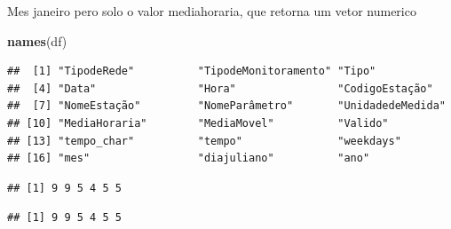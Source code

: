 \documentclass[]{book}
\newenvironment{Shaded}{\begin{snugshade}}{\end{snugshade}}
\newcommand{\KeywordTok}[1]{\textcolor[rgb]{0.13,0.29,0.53}{\textbf{#1}}}
\newcommand{\DecValTok}[1]{\textcolor[rgb]{0.00,0.00,0.81}{#1}}
\newcommand{\StringTok}[1]{\textcolor[rgb]{0.31,0.60,0.02}{#1}}
\newcommand{\OperatorTok}[1]{\textcolor[rgb]{0.81,0.36,0.00}{\textbf{#1}}}
\newcommand{\NormalTok}[1]{#1}
\begin{document}
Mes janeiro pero solo o valor mediahoraria, que retorna um vetor
numerico

\begin{Shaded}
\begin{Highlighting}[]
\KeywordTok{names}\NormalTok{(df)}
\end{Highlighting}
\end{Shaded}

\begin{verbatim}
##  [1] "TipodeRede"          "TipodeMonitoramento" "Tipo"               
##  [4] "Data"                "Hora"                "CodigoEstação"      
##  [7] "NomeEstação"         "NomeParâmetro"       "UnidadedeMedida"    
## [10] "MediaHoraria"        "MediaMovel"          "Valido"             
## [13] "tempo_char"          "tempo"               "weekdays"           
## [16] "mes"                 "diajuliano"          "ano"
\end{verbatim}

\begin{Shaded}
\end{Shaded}

\begin{verbatim}
## [1] 9 9 5 4 5 5
\end{verbatim}

\begin{Shaded}
\end{Shaded}

\begin{verbatim}
## [1] 9 9 5 4 5 5
\end{verbatim}

\begin{Shaded}
\end{Shaded}
\end{document}
